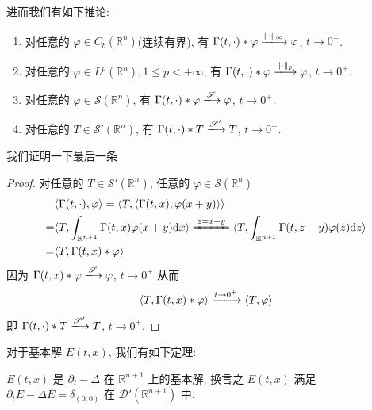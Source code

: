 \documentclass[11pt]{ctexart}[UTF8]
\begin{document}
进而我们有如下推论:
\begin{corollary}
    \begin{enumerate}
        \item 对任意的 $\varphi \in C_{b}(\mathbb{R}^n)$(连续有界), 有 $\Gamma(t,\cdot) \ast \varphi \xlongrightarrow{\Vert\cdot\Vert_{\infty}} \varphi$, $t \to 0^+$.
        \item 对任意的 $\varphi \in L^p(\mathbb{R}^n), 1 \leq p < +\infty$, 有 $\Gamma(t,\cdot) \ast \varphi \xlongrightarrow{\Vert\cdot\Vert_{p}} \varphi$, $t \to 0^+$.
        \item 对任意的 $\varphi \in \mathscr{S}(\mathbb{R}^n)$, 有 $\Gamma(t,\cdot) \ast \varphi \xlongrightarrow{\mathscr{S}} \varphi$, $t \to 0^+$.
        \item 对任意的 $T \in \mathscr{S}'(\mathbb{R}^n)$, 有 $\Gamma(t,\cdot) \ast T \xlongrightarrow{\mathscr{S}'} T$, $t \to 0^+$.
    \end{enumerate}
\end{corollary}
我们证明一下最后一条
\begin{proof}
    对任意的 $T \in \mathscr{S}'(\mathbb{R}^n)$, 任意的 $\varphi \in \mathscr{S}(\mathbb{R}^n)$
    \begin{equation*}
        \begin{aligned}
                & \langle \Gamma(t,\cdot), \varphi \rangle = \langle T, \langle \Gamma(t,x), \varphi(x+y) \rangle\rangle\\
              = & \langle T,\int_{\mathbb{R}^{n+1}} \Gamma(t,x) \varphi(x+y) \mathrm{d}x\rangle \xlongequal{z=x+y} \langle T, \int_{\mathbb{R}^{n+1}}\Gamma(t,z-y)\varphi(z) \mathrm{d}z \rangle\\
              = & \langle T, \Gamma(t,x) \ast \varphi \rangle
        \end{aligned}
    \end{equation*}
    因为 $ \Gamma(t,x) \ast \varphi \xlongrightarrow{\mathscr{S}} \varphi $, $t \to 0^+$ 从而
    \begin{equation*}
        \langle T, \Gamma(t,x) \ast \varphi \rangle \xlongrightarrow{t \to 0^+} \langle T, \varphi \rangle
    \end{equation*}
    即 $\Gamma(t,\cdot) \ast T \xlongrightarrow{\mathscr{S}'} T$, $t \to 0^+$.
\end{proof}
对于基本解 $E(t,x)$, 我们有如下定理:
\begin{theorem}
    $E(t,x)$ 是 $\partial_{t}-\Delta$ 在 $\mathbb{R}^{n+1}$ 上的基本解, 换言之 $E(t,x)$ 满足 $\partial_{t} E - \Delta E = \delta_{(0,0)}$ 在 $\mathscr{D}'(\mathbb{R}^{n+1})$ 中.
\end{theorem}
\end{document}

